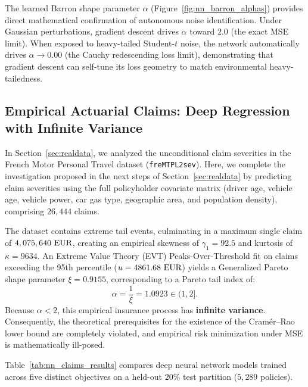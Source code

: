 The learned Barron shape parameter $\alpha$ (Figure~\ref{fig:nn_barron_alphas}) provides direct mathematical confirmation of autonomous noise identification. Under Gaussian perturbations, gradient descent drives $\alpha$ toward $2.0$ (the exact MSE limit). When exposed to heavy-tailed Student-$t$ noise, the network automatically drives $\alpha \to 0.00$ (the Cauchy redescending loss limit), demonstrating that gradient descent can self-tune its loss geometry to match environmental heavy-tailedness.

\subsection{Empirical Actuarial Claims: Deep Regression with Infinite Variance}
\label{sec:nn_claims}

In Section~\ref{sec:realdata}, we analyzed the unconditional claim severities in the French Motor Personal Travel dataset (\texttt{freMTPL2sev}). Here, we complete the investigation proposed in the next steps of Section~\ref{sec:realdata} by predicting claim severities using the full policyholder covariate matrix (driver age, vehicle age, vehicle power, car gas type, geographic area, and population density), comprising $26,444$ claims.

The dataset contains extreme tail events, culminating in a maximum single claim of $4,075,640\text{ \text{EUR}}$, creating an empirical skewness of $\gamma_1 = 92.5$ and kurtosis of $\kappa = 9634$. An Extreme Value Theory (EVT) Peaks-Over-Threshold fit on claims exceeding the 95th percentile ($u = 4861.68\text{ \text{EUR}}$) yields a Generalized Pareto shape parameter $\xi = 0.9155$, corresponding to a Pareto tail index of:
\begin{equation}
  \alpha = \frac{1}{\xi} = 1.0923 \in (1, 2].
\end{equation}
Because $\alpha < 2$, this empirical insurance process has \textbf{infinite variance}. Consequently, the theoretical prerequisites for the existence of the Cram\'er--Rao lower bound are completely violated, and empirical risk minimization under MSE is mathematically ill-posed.

Table~\ref{tab:nn_claims_results} compares deep neural network models trained across five distinct objectives on a held-out $20\%$ test partition ($5,289$ policies).

